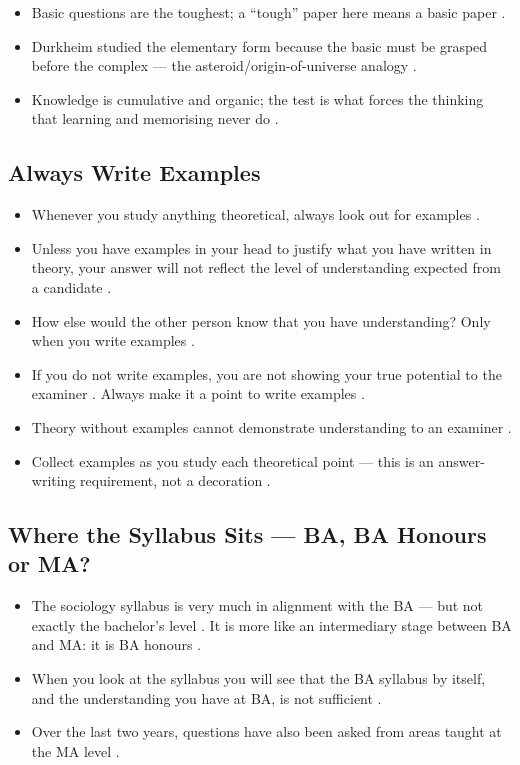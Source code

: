 \begin{QuickRevision}
\begin{itemize}
    \item Basic questions are the toughest; a ``tough'' paper here means a basic paper .
    \item Durkheim studied the elementary form because the basic must be grasped before the complex --- the asteroid/origin-of-universe analogy .
    \item Knowledge is cumulative and organic; the test is what forces the thinking that learning and memorising never do .
\end{itemize}
\end{QuickRevision}

\subsection{Always Write Examples}
\begin{itemize}
    \item Whenever you study anything theoretical, always look out for examples .
    \item Unless you have examples in your head to justify what you have written in theory, your answer will not reflect the level of understanding expected from a candidate .
    \item How else would the other person know that you have understanding? Only when you write examples .
    \item If you do not write examples, you are not showing your true potential to the examiner . Always make it a point to write examples .
\end{itemize}

\begin{QuickRevision}
\begin{itemize}
    \item Theory without examples cannot demonstrate understanding to an examiner .
    \item Collect examples as you study each theoretical point --- this is an answer-writing requirement, not a decoration .
\end{itemize}
\end{QuickRevision}

\subsection{Where the Syllabus Sits --- BA, BA Honours or MA?}
\begin{itemize}
    \item The sociology syllabus is very much in alignment with the BA --- but not exactly the bachelor's level . It is more like an intermediary stage between BA and MA: it is BA honours .
    \item When you look at the syllabus you will see that the BA syllabus by itself, and the understanding you have at BA, is not sufficient .
    \item Over the last two years, questions have also been asked from areas taught at the MA level .
\end{itemize}

